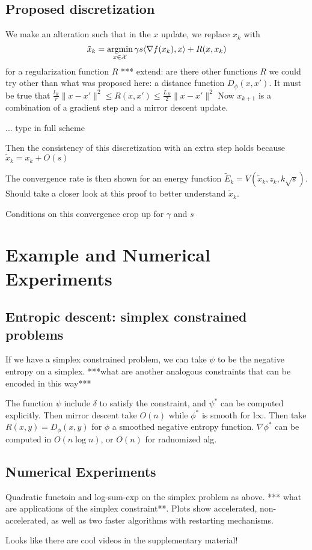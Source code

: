 \subsection{Proposed discretization}
We make an alteration such that in the $x$ update, we replace $x_k$ with 
\[\tilde x_k = \argmin_{x\in\mathcal X} \gamma s \langle \nabla f(x_k), x \rangle + R(x,x_k)  \]
for a regularization function $R$ *** extend: are there other functions $R$ we could try other than what was proposed here: a distance function $D_\phi (x,x')$. It must be true that $\frac{l_R}{r} \|x-x'\|^2 \leq R(x,x') \leq \frac{L_R}{2} \|x-x'\|^2$
Now $x_{k+1}$ is a combination of a gradient step and a mirror descent update.

... type in full scheme

Then the consistency of this discretization with an extra step holds because $\tilde x_k = x_k + O(s)$

The convergence rate is then shown for an energy function $\tilde E_k = V(\tilde x_k, z_k, k\sqrt{s})$. Should take a closer look at this proof to better understand $\tilde x_k$.

Conditions on this convergence crop up for $\gamma$ and $s$

\section{Example and Numerical Experiments}
\subsection{Entropic descent: simplex constrained problems}
If we have a simplex constrained problem, we can take $\psi$ to be the negative entropy on a simplex. ***what are another analogous constraints that can be encoded in this way***

The function $\psi$ include $\delta$ to satisfy the constraint, and $\psi^*$ can be computed explicitly. Then mirror descent take $O(n)$ while $\phi^*$ is smooth for l$\infty$. Then take $R(x,y) = D_\phi(x,y)$ for $\phi$ a smoothed negative entropy function. $\nabla \phi^*$ can be computed in $O(n\log n)$, or $O(n)$ for radnomized alg. 

\subsection{Numerical Experiments}
Quadratic functoin and log-sum-exp on the simplex problem as above. *** what are applications of the simplex constraint**. Plots show accelerated, non-accelerated, as well as two faster algorithms with restarting mechanisms. 

Looks like there are cool videos in the supplementary material!






